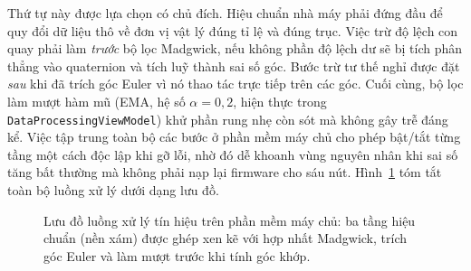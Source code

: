 \documentclass[../DoAn.tex]{subfiles}
\begin{document}
Thứ tự này được lựa chọn có chủ đích. Hiệu chuẩn nhà máy phải đứng đầu để quy đổi dữ liệu thô về đơn vị vật lý đúng tỉ lệ và đúng trục. Việc trừ độ lệch con quay phải làm \emph{trước} bộ lọc Madgwick, nếu không phần độ lệch dư sẽ bị tích phân thẳng vào quaternion và tích luỹ thành sai số góc. Bước trừ tư thế nghỉ được đặt \emph{sau} khi đã trích góc Euler vì nó thao tác trực tiếp trên các góc. Cuối cùng, bộ lọc làm mượt hàm mũ (EMA, hệ số $\alpha = 0{,}2$, hiện thực trong \texttt{DataProcessingViewModel}) khử phần rung nhẹ còn sót mà không gây trễ đáng kể. Việc tập trung toàn bộ các bước ở phần mềm máy chủ cho phép bật/tắt từng tầng một cách độc lập khi gỡ lỗi, nhờ đó dễ khoanh vùng nguyên nhân khi sai số tăng bất thường mà không phải nạp lại firmware cho sáu nút. Hình~\ref{fig:calib_pipeline} tóm tắt toàn bộ luồng xử lý dưới dạng lưu đồ.

\begin{figure}[H]
    \centering
    \caption{Lưu đồ luồng xử lý tín hiệu trên phần mềm máy chủ: ba tầng hiệu chuẩn (nền xám) được ghép xen kẽ với hợp nhất Madgwick, trích góc Euler và làm mượt trước khi tính góc khớp.}
    \label{fig:calib_pipeline}
\end{figure}
\end{document}
